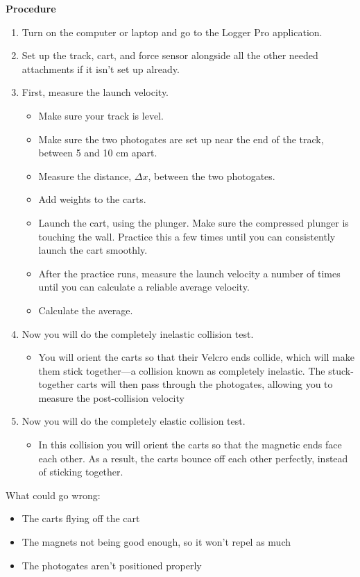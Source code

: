 \documentclass[idxtotoc,hyperref,openany]{labbook} %
\begin{document}
\hfill \break
\textbf{Procedure}
\begin{enumerate}
    \item Turn on the computer or laptop and go to the Logger Pro application.
    \item Set up the track, cart, and force sensor alongside all the other needed attachments if it isn't set up already.
    \item First, measure the launch velocity.
    \begin{itemize}
        \item Make sure your track is level.
        \item Make sure the two photogates are set up near the end of the track, between 5 and 10 cm apart.
        \item Measure the distance, $\Delta x$, between the two photogates.
        \item Add weights to the carts.
        \item Launch the cart, using the plunger. Make sure the compressed plunger is touching the wall. Practice this a few times until you can consistently launch the cart smoothly.
        \item After the practice runs, measure the launch velocity a number of times until you can calculate a reliable average velocity.
        \item Calculate the average.
    \end{itemize}
    \item Now you will do the completely inelastic collision test.
    \begin{itemize}
        \item You will orient the carts so that their Velcro ends collide, which will make them stick together—a collision known as completely inelastic. The stuck-together carts will then pass through the photogates, allowing you to measure the post-collision velocity
    \end{itemize}
    \item Now you will do the completely elastic collision test.
    \begin{itemize}
        \item In this collision you will orient the carts so that the magnetic ends face each other. As a result, the carts bounce off each other perfectly, instead of sticking together.
    \end{itemize}
\end{enumerate}

\hfill \break
What could go wrong:
\begin{itemize}
    \item The carts flying off the cart
    \item The magnets not being good enough, so it won't repel as much
    \item The photogates aren't positioned properly
\end{itemize}
\end{document}

